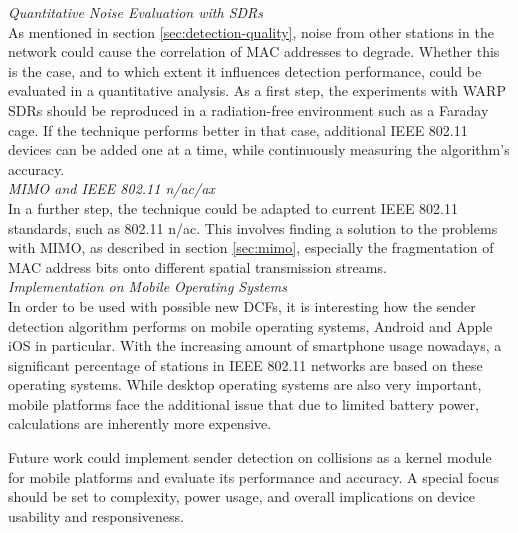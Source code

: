 \textit{Quantitative Noise Evaluation with SDRs}\\

As mentioned in section \ref{sec:detection-quality}, noise from other stations in the network could cause the correlation of \gls{MAC} addresses to degrade. Whether this is the case, and to which extent it influences detection performance, could be evaluated in a quantitative analysis. As a first step, the experiments with \gls{WARP} \glspl{SDR} should be reproduced in a radiation-free environment such as a Faraday cage. If the technique performs better in that case, additional IEEE 802.11 devices can be added one at a time, while continuously measuring the algorithm's accuracy.\\

\textit{MIMO and IEEE 802.11 n/ac/ax}\\

In a further step, the technique could be adapted to current IEEE 802.11 standards, such as 802.11 n/ac. This involves finding a solution to the problems with \gls{MIMO}, as described in section \ref{sec:mimo}, especially the fragmentation of \gls{MAC} address bits onto different spatial transmission streams.\\

\textit{Implementation on Mobile Operating Systems}\\

In order to be used with possible new \glspl{DCF}, it is interesting how the sender detection algorithm performs on mobile operating systems, Android and Apple iOS in particular. With the increasing amount of smartphone usage nowadays, a significant percentage of stations in IEEE 802.11 networks are based on these operating systems. While desktop operating systems are also very important, mobile platforms face the additional issue that due to limited battery power, calculations are inherently more expensive.

Future work could implement sender detection on collisions as a kernel module for mobile platforms and evaluate its performance and accuracy. A special focus should be set to complexity, power usage, and overall implications on device usability and responsiveness.
